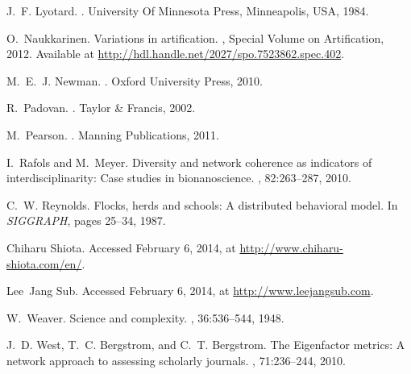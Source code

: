 \documentclass{article}
\begin{document}
\begin{thebibliography}{10}
J.~F. Lyotard.
.
\newblock University Of Minnesota Press, Minneapolis, USA, 1984.

O.~Naukkarinen.
\newblock Variations in artification.
, Special Volume on Artification, 2012.
\newblock Available at \url{http://hdl.handle.net/2027/spo.7523862.spec.402}.

M.~E.~J. Newman.
.
\newblock Oxford University Press, 2010.

R.~Padovan.
.
\newblock Taylor \& Francis, 2002.

M.~Pearson.
.
\newblock Manning Publications, 2011.

I.~Rafols and M.~Meyer.
\newblock Diversity and network coherence as indicators of interdisciplinarity:
  Case studies in bionanoscience.
, 82:263--287, 2010.

C.~W. Reynolds.
\newblock Flocks, herds and schools: A distributed behavioral model.
\newblock In {\em SIGGRAPH}, pages 25--34, 1987.

Chiharu Shiota.
\newblock Accessed February 6, 2014, at
  \url{http://www.chiharu-shiota.com/en/}.

Lee~Jang Sub.
\newblock Accessed February 6, 2014, at \url{http://www.leejangsub.com}.

W.~Weaver.
\newblock Science and complexity.
, 36:536--544, 1948.

J.~D. West, T.~C. Bergstrom, and C.~T. Bergstrom.
\newblock The {Eigenfactor} metrics: A network approach to assessing scholarly
  journals.
, 71:236--244, 2010.

\end{thebibliography}
\end{document}
